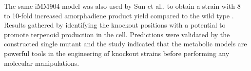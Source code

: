 The same iMM904 model was also used by Sun et al., to obtain a strain with 8- to 10-fold increased amorphadiene product yield compared to the wild type \cite{sun2014identification}. Results gathered by identifying the knockout positions with a potential to promote terpenoid production in the cell. Predictions were validated by the constructed single mutant and the study indicated that the metabolic models are powerful tools in the engineering of knockout strains before performing any molecular manipulations.
